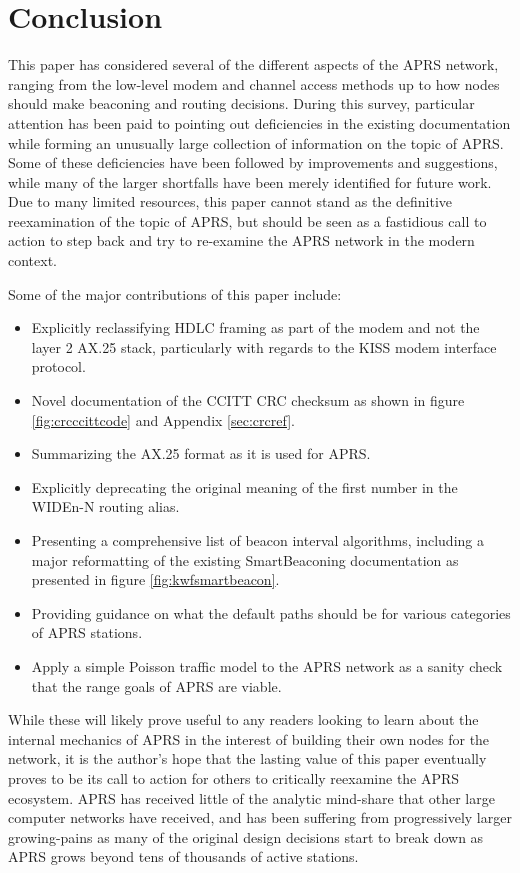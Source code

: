 \chapter{Conclusion}

This paper has considered several of the different aspects of the APRS network,
ranging from the low-level modem and channel access methods up to
how nodes should make beaconing and routing decisions.
During this survey, particular attention has been paid to pointing out
deficiencies in the existing documentation while forming 
an unusually large collection of information on the topic of APRS.
Some of these deficiencies have been followed by improvements
and suggestions, while many of the larger shortfalls have
been merely identified for future work.
Due to many limited resources, this paper cannot stand as the definitive
reexamination of the topic of APRS,
but should be seen as a fastidious call to action to step back and
try to re-examine the APRS network in the modern context.

Some of the major contributions of this paper include:
\begin{itemize}
	\item Explicitly reclassifying HDLC framing as part of the modem
		and not the layer 2 AX.25 stack, particularly with
		regards to the KISS modem interface protocol.
	\item Novel documentation of the CCITT CRC checksum as shown in
		figure \ref{fig:crcccittcode} and Appendix \ref{sec:crcref}.
	\item Summarizing the AX.25 format as it is used for APRS.
	\item Explicitly deprecating the original meaning of the first number
		in the WIDEn-N routing alias.
	\item Presenting a comprehensive list of beacon interval
		algorithms, including a major reformatting of the
		existing SmartBeaconing documentation as presented
		in figure \ref{fig:kwfsmartbeacon}.
	\item Providing guidance on what the default paths should be for
		various categories of APRS stations.
	\item Apply a simple Poisson traffic model to the APRS network
		as a sanity check that the range goals of APRS are viable.
\end{itemize}

While these will likely prove useful to any readers looking to learn about
the internal mechanics of APRS in the interest of building their own nodes
for the network, it is the author's hope that the lasting value of this paper
eventually proves to be its call to action for others to critically 
reexamine the APRS ecosystem.
APRS has received little of the analytic mind-share that other large
computer networks have received,
and has been suffering from progressively larger growing-pains as many
of the original design decisions start to break down as APRS grows beyond tens of
thousands of active stations.


